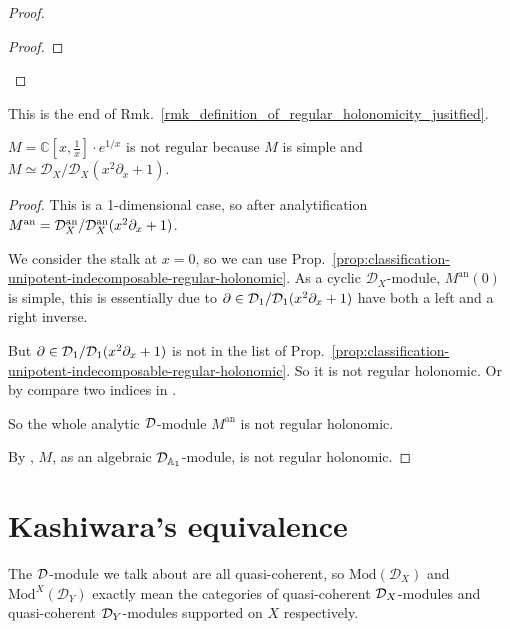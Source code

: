 \begin{remark}
\begin{proof}
\begin{enumerate}
\begin{proof}
                  \end{proof}

        \end{enumerate}

    \end{proof}

    This is the end of Rmk.~\ref{rmk_definition_of_regular_holonomicity_jusitfied}.

\end{remark}

\begin{example}\label{ex:first-example-non-regular-d-module}
    $M=\mathbb{C}\left[ x, \frac{1}{x} \right]\cdot e^{1/x}$ is not regular because $M$ is simple and $M\simeq \mathcal{D}_{X} /\mathcal{D}_{X}(x^{2}\partial_{x}+1)$.
\end{example}

\begin{proof}
    This is a 1-dimensional case,
    so after analytification $M^{\mathrm{an}} = \mathcal{D}^{\mathrm{an}}_X / \mathcal{D}^{\mathrm{an}}_X (x^2\partial_x+1)$.

    We consider the stalk at $x=0$, so we can use Prop.~\ref{prop:classification-unipotent-indecomposable-regular-holonomic}.
    As a cyclic $\mathcal{D}_X$-module, $M^{\mathrm{an}}(0)$ is simple,
    this is essentially due to $\partial \in \mathcal{D}_1 / \mathcal{D}_1 (x^2\partial_x+1)$ have both a left and a right inverse.

    But $\partial \in \mathcal{D}_1 / \mathcal{D}_1 (x^2\partial_x+1)$ is not in the list of Prop.~\ref{prop:classification-unipotent-indecomposable-regular-holonomic}.
    So it is not regular holonomic. Or by compare two indices in \cite[Def.~5.1.10]{Bjork1993AnalyticDModules}.

    So the whole analytic $\mathcal{D}$-module $M^{\mathrm{an}}$ is not regular holonomic.

    By \cite[Prop.~6.1.12]{hotta2008d}, $M$, as an algebraic $\mathcal{D}_{\mathbb{A}_1}$-module, is not regular holonomic.
\end{proof}



\section{Kashiwara's equivalence}
\begin{remark}[Recall]
    The $\mathcal{D}$-module we talk about are all quasi-coherent, so $\mathrm{Mod}(\mathcal{D}_{X})$ and $\mathrm{Mod}^{X}(\mathcal{D}_{Y})$ exactly mean the categories of quasi-coherent $\mathcal{D}_X$-modules and quasi-coherent $\mathcal{D}_Y$-modules supported on $X$ respectively.
\end{remark}

